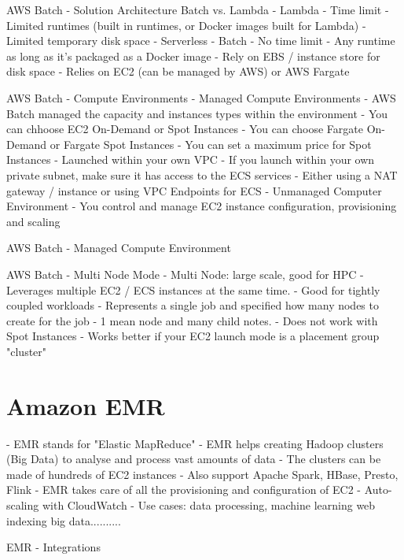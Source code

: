\documentclass[11pt]{book}
\begin{document}
    AWS Batch - Solution Architecture
    Batch vs. Lambda
    - Lambda
        - Time limit
        - Limited runtimes (built in runtimes, or Docker images built for Lambda)
        - Limited temporary disk space
        - Serverless
    - Batch
        - No time limit
        - Any runtime as long as it's packaged as a Docker image
        - Rely on EBS / instance store for disk space
        - Relies on EC2 (can be managed by AWS) or AWS Fargate

    AWS Batch - Compute Environments
    - Managed Compute Environments
        - AWS Batch managed the capacity and instances types within the environment
        - You can chhoose EC2 On-Demand or Spot Instances
        - You can choose Fargate On-Demand or Fargate Spot Instances
        - You can set a maximum price for Spot Instances
        - Launched within your own VPC
            - If you launch within your own private subnet, make sure it has access to the ECS services
            - Either using a NAT gateway / instance or using VPC Endpoints for ECS
    - Unmanaged Computer Environment
        - You control and manage EC2 instance configuration, provisioning and scaling

    AWS Batch - Managed Compute Environment

    AWS Batch - Multi Node Mode
    - Multi Node: large scale, good for HPC
        - Leverages multiple EC2 / ECS instances at the same time.
        - Good for tightly coupled workloads
        - Represents a single job and specified how many nodes to create for the job
        - 1 mean node and many child notes.
        - Does not work with Spot Instances
        - Works better if your EC2 launch mode is a placement group "cluster"

    \section{Amazon EMR}
    - EMR stands for "Elastic MapReduce"
    - EMR helps creating Hadoop clusters (Big Data) to analyse and process vast amounts of data
    - The clusters can be made of hundreds of EC2 instances
    - Also support Apache Spark, HBase, Presto, Flink
    - EMR takes care of all the provisioning and configuration of EC2
    - Auto-scaling with CloudWatch
    - Use cases: data processing, machine learning web indexing big data..........

    EMR - Integrations
\end{document}
